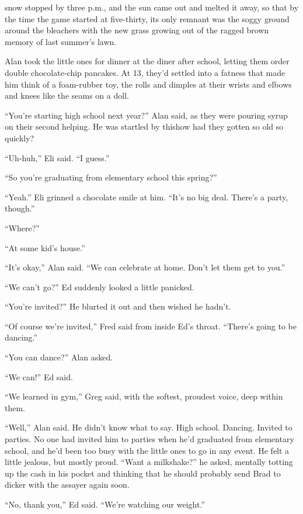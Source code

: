  snow stopped by three p.m., and the sun came out and melted it
away, so that by the time the game started at five-thirty, its only
remnant was the soggy ground around the bleachers with the new grass
growing out of the ragged brown memory of last summer's lawn.

Alan took the little ones for dinner at the diner after school,
letting them order double chocolate-chip pancakes.  At 13, they'd
settled into a fatness that made him think of a foam-rubber toy, the
rolls and dimples at their wrists and elbows and knees like the seams
on a doll.

``You're starting high school next year?'' Alan said, as they were
pouring syrup on their second helping.  He was startled by this\dash{}how
had they gotten so old so quickly?

``Uh-huh,'' Eli said.  ``I guess.''

``So you're graduating from elementary school this spring?''

``Yeah.'' Eli grinned a chocolate smile at him.  ``It's no big deal. 
There's a party, though.''

``Where?''

``At some kid's house.''

``It's okay,'' Alan said.  ``We can celebrate at home.  Don't let them
get to you.''

``We can't go?'' Ed suddenly looked a little panicked.

``You're invited?'' He blurted it out and then wished he hadn't.

``Of course we're invited,'' Fred said from inside Ed's throat. 
``There's going to be dancing.''

``You can dance?'' Alan asked.

``We can!'' Ed said.

``We learned in gym,'' Greg said, with the softest, proudest voice,
deep within them.

``Well,'' Alan said.  He didn't know what to say.  High school. 
Dancing.  Invited to parties.  No one had invited him to parties when
he'd graduated from elementary school, and he'd been too busy with the
little ones to go in any event.  He felt a little jealous, but mostly
proud.  ``Want a milkshake?'' he asked, mentally totting up the cash
in his pocket and thinking that he should probably send Brad to dicker
with the assayer again soon.

``No, thank you,'' Ed said.  ``We're watching our weight.''

